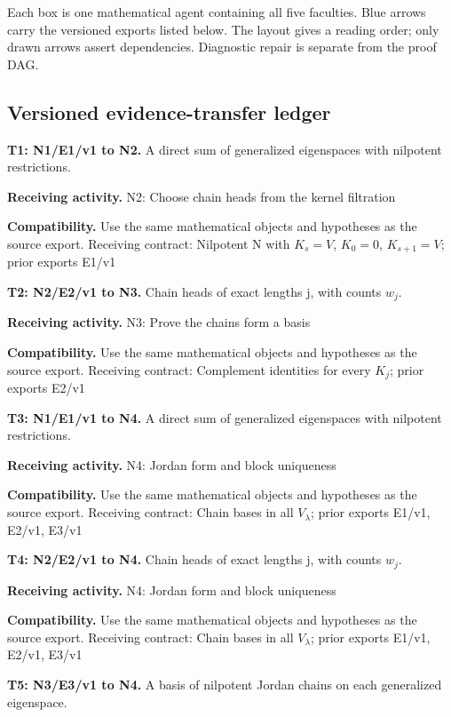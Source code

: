 \documentclass[preprint,12pt,aps,pra,showkeys,amsmath,amssymb,superscriptaddress,floatfix]{revtex4-2}
\theoremstyle{definition}
\theoremstyle{remark}
\newcommand{\field}[2]{\par\smallskip\noindent\textbf{#1.} #2\par}
\begin{document}
Each box is one mathematical agent containing all five faculties. Blue
arrows carry the versioned exports listed below. The layout gives a
reading order; only drawn arrows assert dependencies. Diagnostic repair
is separate from the proof DAG.

\clearpage\subsection{Versioned evidence-transfer ledger}

\begingroup\small\linespread{1.05}\selectfont

\field{T1: N1/E1/v1 to N2}{A direct sum of generalized eigenspaces with nilpotent restrictions.}

\field{Receiving activity}{N2: Choose chain heads from the kernel filtration}

\field{Compatibility}{Use the same mathematical objects and hypotheses as the source export.
Receiving contract: Nilpotent N with \(K_s=V\), \(K_{0}=0\),
\(K_{s+1}=V\); prior exports E1/v1}

\field{T2: N2/E2/v1 to N3}{Chain heads of exact lengths j, with counts \(w_j\).}

\field{Receiving activity}{N3: Prove the chains form a basis}

\field{Compatibility}{Use the same mathematical objects and hypotheses as the source export.
Receiving contract: Complement identities for every \(K_j\); prior
exports E2/v1}

\field{T3: N1/E1/v1 to N4}{A direct sum of generalized eigenspaces with nilpotent restrictions.}

\field{Receiving activity}{N4: Jordan form and block uniqueness}

\field{Compatibility}{Use the same mathematical objects and hypotheses as the source export.
Receiving contract: Chain bases in all \(V_\lambda\); prior exports
E1/v1, E2/v1, E3/v1}

\field{T4: N2/E2/v1 to N4}{Chain heads of exact lengths j, with counts \(w_j\).}

\field{Receiving activity}{N4: Jordan form and block uniqueness}

\field{Compatibility}{Use the same mathematical objects and hypotheses as the source export.
Receiving contract: Chain bases in all \(V_\lambda\); prior exports
E1/v1, E2/v1, E3/v1}

\field{T5: N3/E3/v1 to N4}{A basis of nilpotent Jordan chains on each generalized eigenspace.}
\end{document}
